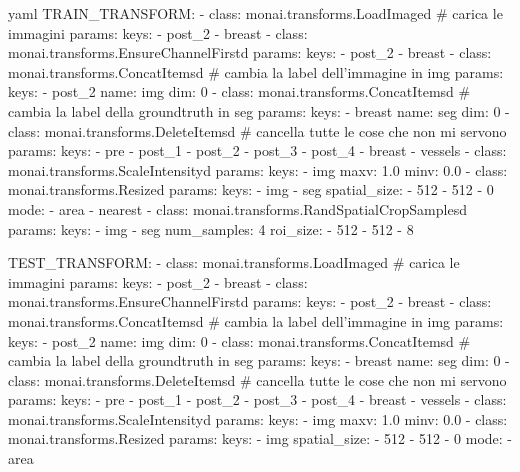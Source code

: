 \begin{code}{yaml}
TRAIN_TRANSFORM:
  - class: monai.transforms.LoadImaged                                                                  # carica le immagini
    params:
      keys:
        - post_2
        - breast
  - class: monai.transforms.EnsureChannelFirstd
    params:
      keys:
        - post_2
        - breast
  - class: monai.transforms.ConcatItemsd                                                                # cambia la label dell'immagine in img
    params:
      keys:
        - post_2
      name: img
      dim: 0
  - class: monai.transforms.ConcatItemsd                                                                # cambia la label della groundtruth in seg
    params:
      keys:
        - breast
      name: seg
      dim: 0
  - class: monai.transforms.DeleteItemsd                                                                # cancella tutte le cose che non mi servono
    params:
      keys:
        - pre
        - post_1
        - post_2
        - post_3
        - post_4
        - breast
        - vessels
  - class: monai.transforms.ScaleIntensityd
    params:
      keys:
        - img
      maxv: 1.0
      minv: 0.0
  - class: monai.transforms.Resized
    params:
      keys:
        - img
        - seg
      spatial_size: 
        - 512 
        - 512 
        - 0
      mode:
        - area
        - nearest
  - class: monai.transforms.RandSpatialCropSamplesd
    params:
      keys:
        - img
        - seg
      num_samples: 4
      roi_size: 
        - 512
        - 512
        - 8




TEST_TRANSFORM:
  - class: monai.transforms.LoadImaged                                                                  # carica le immagini
    params:
      keys:
        - post_2
        - breast
  - class: monai.transforms.EnsureChannelFirstd
    params:
      keys:
        - post_2
        - breast
  - class: monai.transforms.ConcatItemsd                                                                # cambia la label dell'immagine in img
    params:
      keys:
        - post_2
      name: img
      dim: 0
  - class: monai.transforms.ConcatItemsd                                                                # cambia la label della groundtruth in seg
    params:
      keys:
        - breast
      name: seg
      dim: 0
  - class: monai.transforms.DeleteItemsd                                                                # cancella tutte le cose che non mi servono
    params:
      keys:
        - pre
        - post_1
        - post_2
        - post_3
        - post_4
        - breast
        - vessels
  - class: monai.transforms.ScaleIntensityd
    params:
      keys:
        - img
      maxv: 1.0
      minv: 0.0
  - class: monai.transforms.Resized
    params:
      keys:
        - img
      spatial_size: 
        - 512 
        - 512 
        - 0
      mode:
        - area




\end{code}
